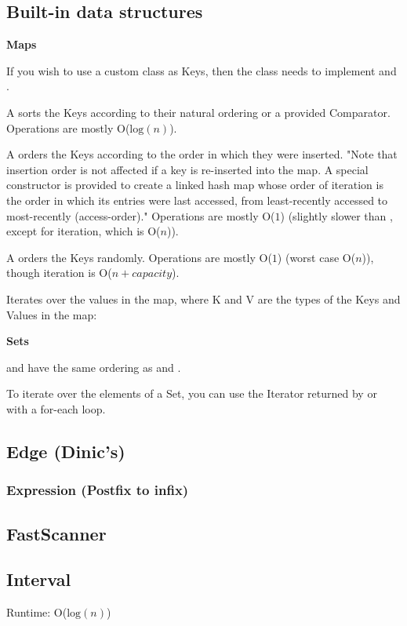 
\subsection*{Built-in data structures}

\textbf{Maps}

If you wish to use a custom class as Keys, then the class needs to implement  and .

A  sorts the Keys according to their natural ordering or a provided Comparator. Operations are mostly O($\text{log}(n)$).

A  orders the Keys according to the order in which they were inserted. "Note that insertion order is not affected if a key is re-inserted into the map. A special constructor is provided to create a linked hash map whose order of iteration is the order in which its entries were last accessed, from least-recently accessed to most-recently (access-order)." Operations are mostly O($1$) (slightly slower than , except for iteration, which is O($n$)).

A  orders the Keys randomly. Operations are mostly O($1$) (worst case O($n$)), though iteration is O($n+capacity$).

Iterates over the values in the map, where K and V are the types of the Keys and Values in the map:



\textbf{Sets}

 and  have the same ordering as  and .

To iterate over the elements of a Set, you can use the Iterator returned by  or with a for-each loop.

\subsection*{Edge (Dinic's)}



\subsubsection*{Expression (Postfix to infix)}



\subsection*{FastScanner}



\subsection*{Interval}

Runtime: O($\text{log}(n)$)



\newpage